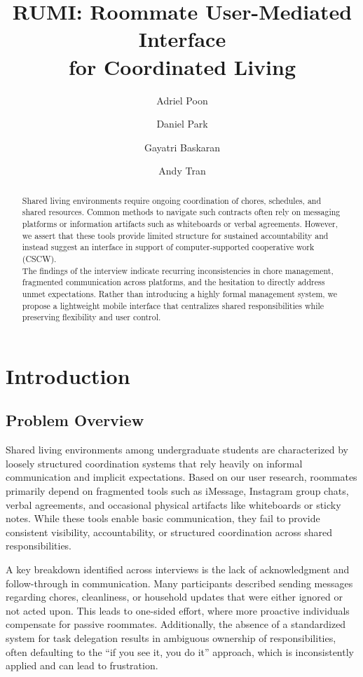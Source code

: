 \documentclass[sigconf]{acmart}
\title{RUMI: Roommate User-Mediated Interface\\for Coordinated Living}
\author{Adriel Poon}
\affiliation{%
  \institution{}
  \city{}
  \state{}
  \country{}
}
\author{Daniel Park}
\affiliation{%
  \institution{}
  \city{}
  \state{}
  \country{}
}
\author{Gayatri Baskaran}
\affiliation{%
  \institution{}
  \city{}
  \state{}
  \country{}
}
\author{Andy Tran}
\affiliation{%
  \institution{}
  \city{}
  \state{}
  \country{}
}
\begin{document}
\begin{abstract}
Shared living environments require ongoing coordination of chores, schedules, and shared resources. Common methods to navigate such contracts often rely on messaging platforms or information artifacts such as whiteboards or verbal agreements. However, we assert that these tools provide limited structure for sustained accountability and instead suggest an interface in support of computer-supported cooperative work (CSCW).\\

The findings of the interview indicate recurring inconsistencies in chore management, fragmented communication across platforms, and the hesitation to directly address unmet expectations. Rather than introducing a highly formal management system, we propose a lightweight mobile interface that centralizes shared responsibilities while preserving flexibility and user control.
\end{abstract}

\maketitle

\section{Introduction}

\subsection{Problem Overview}
Shared living environments among undergraduate students are characterized by loosely structured coordination systems that rely heavily on informal communication and implicit expectations. Based on our user research, roommates primarily depend on fragmented tools such as iMessage, Instagram group chats, verbal agreements, and occasional physical artifacts like whiteboards or sticky notes. While these tools enable basic communication, they fail to provide consistent visibility, accountability, or structured coordination across shared responsibilities.

A key breakdown identified across interviews is the lack of acknowledgment and follow-through in communication. Many participants described sending messages regarding chores, cleanliness, or household updates that were either ignored or not acted upon. This leads to one-sided effort, where more proactive individuals compensate for passive roommates. Additionally, the absence of a standardized system for task delegation results in ambiguous ownership of responsibilities, often defaulting to the ``if you see it, you do it'' approach, which is inconsistently applied and can lead to frustration.
\end{document}
